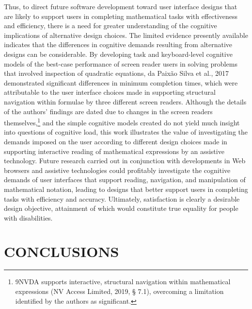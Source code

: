 \documentclass[11.5pt]{sig-alternate} %
\begin{document}
\begin{large}
Thus, to direct future software development toward user interface designs that are likely to support users in completing mathematical tasks with effectiveness and efficiency, there is a need for greater understanding of the cognitive implications of alternative design choices. The limited evidence presently available indicates that the differences in cognitive demands resulting from alternative designs can be considerable. By developing task and keyboard-level cognitive models of the best-case performance of screen reader users in solving problems that involved inspection of quadratic equations, da Paixão Silva et al., 2017 demonstrated significant differences in minimum completion times, which were attributable to the user interface choices made in supporting structural navigation within formulae by three different screen readers. Although the details of the authors’ findings are dated due to changes in the screen readers themselves,\footnote{9NVDA supports interactive, structural navigation within mathematical expressions (NV Access Limited, 2019, § 7.1), overcoming a limitation identified by the authors as significant.} and the simple cognitive models created do not yield much insight into questions of cognitive load, this work illustrates the value of investigating the demands imposed on the user according to different design choices made in supporting interactive reading of mathematical expressions by an assistive technology. Future research carried out in conjunction with developments in Web browsers and assistive technologies could profitably investigate the cognitive demands of user interfaces that support reading, navigation, and manipulation of mathematical notation, leading to designs that better support users in completing tasks with efficiency and accuracy. Ultimately, satisfaction is clearly a desirable design objective, attainment of which would constitute true equality for people with disabilities.

\section*{CONCLUSIONS}


\end{large}
\end{document}

